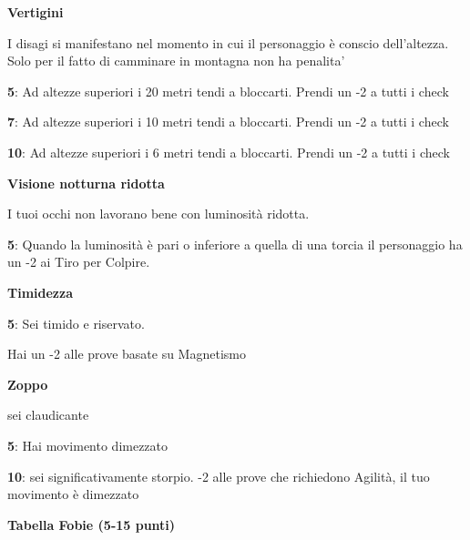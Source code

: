 \documentclass[a4paper,11pt,twoside,openany]{book}
\begin{document}
\textbf{Vertigini}

I disagi si manifestano nel momento in cui il personaggio è conscio dell'altezza. Solo per il fatto di camminare in montagna non ha penalita'

\textbf{5}: Ad altezze superiori i 20 metri tendi a bloccarti. Prendi un -2 a tutti i check

\textbf{7}: Ad altezze superiori i 10 metri tendi a bloccarti. Prendi un -2 a tutti i check

\textbf{10}: Ad altezze superiori i 6 metri tendi a bloccarti. Prendi un -2 a tutti i check

\textbf{Visione notturna ridotta}

I tuoi occhi non lavorano bene con luminosità ridotta.

\textbf{5}: Quando la luminosità è pari o inferiore a quella di una torcia il personaggio ha un -2 ai Tiro per Colpire.

\textbf{Timidezza}

\textbf{5}: Sei timido e riservato.

Hai un -2 alle prove basate su Magnetismo

\textbf{Zoppo}

sei claudicante

\textbf{5}: Hai movimento dimezzato

\textbf{10}: sei significativamente storpio. -2 alle prove che richiedono Agilità, il tuo movimento è dimezzato

\bigskip

\textbf{Tabella Fobie (5-15 punti)}
\end{document}
